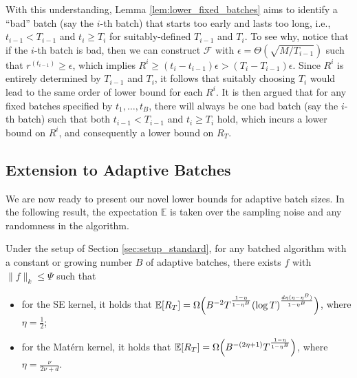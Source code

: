 \documentclass[10pt]{article}
\begin{document}
With this understanding, Lemma \ref{lem:lower_fixed_batches} aims to identify a ``bad'' batch (say the $i$-th batch) that starts too early and lasts too long, i.e., $t_{i-1} < T_{i-1} $ and $t_i \geq T_i$ for suitably-defined $T_{i-1}$ and $T_i$. 
To see why, notice that if the $i$-th batch is bad, then we can construct $\mathcal{F}$ with $\epsilon = \Theta(\sqrt{M/T_{i-1}})$ such that $r^{(t_{i-1})}\geq \epsilon$, which implies $R^i \geq (t_i-t_{i-1}) \epsilon > (T_i-T_{i-1})\epsilon$. Since $R^i$ is entirely determined by $T_{i-1}$ and $T_i$, it follows that suitably choosing $T_i$ would lead to the same order of lower bound for each $R^i$. It is then argued that for any fixed batches specified by $t_1, \ldots, t_B$, there will always be one bad batch (say the $i$-th batch) such that both $t_{i-1} < T_{i-1} $ and $t_i \geq T_i$ hold, which incurs a lower bound on $R^i$, and consequently a lower bound on $R_T$.

\subsection{Extension to Adaptive Batches}
We are now ready to present our novel lower bounds for adaptive batch sizes. In the following result, the expectation $\mathbb{E}$ is taken over the sampling noise and any randomness in the algorithm.
\begin{theorem}
    \label{thm:lower_adaptive_batches}
    Under the setup of Section \ref{sec:setup_standard},
    for any batched algorithm with a constant or growing number $B$ of adaptive batches, there exists $f$ with $ \lVert f\rVert_k \leq \Psi $ such that 
    \begin{itemize}
        \item for the SE kernel, it holds that $\mathbb{E}[R_T] =\Omega\Bigl(B^{-2}T^{\frac{1-\eta}{1-\eta^B}}(\log T)^{\frac{d\eta(\eta-\eta^B)}{1-\eta^B}} \Bigr)$, where $\eta=\frac{1}{2}$;
        \item for the Mat\'ern kernel,  it holds that $\mathbb{E}[R_T] =\Omega\Bigl(B^{-(2\eta+1)}T^{\frac{1-\eta}{1-\eta^B}} \Bigr)$, where $\eta=\frac{\nu}{2\nu+d}$.
    \end{itemize}
\end{theorem}
\end{document}

